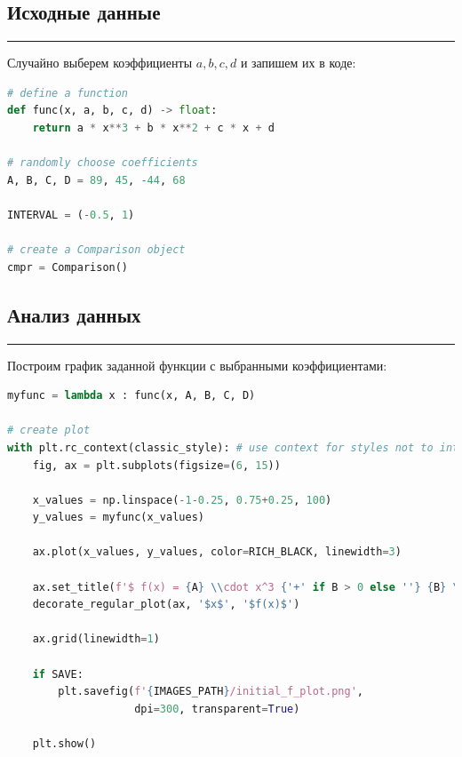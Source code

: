 \documentclass[a4paper, 14pt]{extarticle}
\begin{document}
\subsection*{Исходные данные}\vspace{-20pt}\rule{\linewidth}{0.1mm}

Случайно выберем коэффициенты $a, b, c, d$ и запишем их в коде:

\begin{center}
    \begin{lstlisting}[language=Python]
# define a function
def func(x, a, b, c, d) -> float:
    return a * x**3 + b * x**2 + c * x + d

# randomly choose coefficients
A, B, C, D = 89, 45, -44, 68

INTERVAL = (-0.5, 1)

# create a Comparison object
cmpr = Comparison()
    \end{lstlisting}
\end{center}

\subsection*{Анализ данных}\vspace{-20pt}\rule{\linewidth}{0.1mm}

Построим график заданной функции с выбранными коэффициентами:

\begin{center}
    \begin{lstlisting}[language=Python]
myfunc = lambda x : func(x, A, B, C, D)

# create plot 
with plt.rc_context(classic_style): # use context for styles not to interfere
    fig, ax = plt.subplots(figsize=(6, 15))

    x_values = np.linspace(-1-0.25, 0.75+0.25, 100)
    y_values = myfunc(x_values)

    ax.plot(x_values, y_values, color=RICH_BLACK, linewidth=3)

    ax.set_title(f'$ f(x) = {A} \\cdot x^3 {'+' if B > 0 else ''} {B} \\cdot x^2 {'+' if C > 0 else ''} {C} \\cdot x {'+' if D > 0 else ''} {D} $')
    decorate_regular_plot(ax, '$x$', '$f(x)$')

    ax.grid(linewidth=1)

    if SAVE:
        plt.savefig(f'{IMAGES_PATH}/initial_f_plot.png', 
                    dpi=300, transparent=True)

    plt.show()
    \end{lstlisting}
\end{center}
\end{document}
